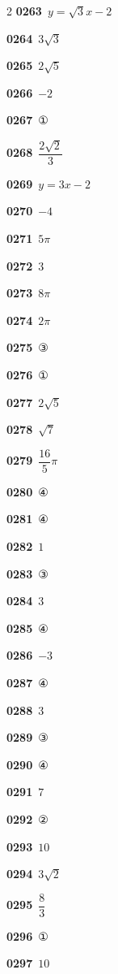 \documentclass[10pt,a4paper]{article}
\begin{document}
\begin{multicols}{2}
\noindent\textbf{0263}\ $y=\sqrt{3}x-2$\par
\noindent\textbf{0264}\ $3\sqrt{3}$\par
\noindent\textbf{0265}\ $2\sqrt{5}$\par
\noindent\textbf{0266}\ $-2$\par
\noindent\textbf{0267}\ ①\par
\noindent\textbf{0268}\ $\dfrac{2\sqrt{2}}{3}$\par
\noindent\textbf{0269}\ $y=3x-2$\par
\noindent\textbf{0270}\ $-4$\par
\noindent\textbf{0271}\ $5\pi$\par
\noindent\textbf{0272}\ $3$\par
\noindent\textbf{0273}\ $8\pi$\par
\noindent\textbf{0274}\ $2\pi$\par
\noindent\textbf{0275}\ ③\par
\noindent\textbf{0276}\ ①\par
\noindent\textbf{0277}\ $2\sqrt{5}$\par
\noindent\textbf{0278}\ $\sqrt{7}$\par
\noindent\textbf{0279}\ $\dfrac{16}{5}\pi$\par
\noindent\textbf{0280}\ ④\par
\noindent\textbf{0281}\ ④\par
\noindent\textbf{0282}\ $1$\par
\noindent\textbf{0283}\ ③\par
\noindent\textbf{0284}\ $3$\par
\noindent\textbf{0285}\ ④\par
\noindent\textbf{0286}\ $-3$\par
\noindent\textbf{0287}\ ④\par
\noindent\textbf{0288}\ $3$\par
\noindent\textbf{0289}\ ③\par
\noindent\textbf{0290}\ ④\par
\noindent\textbf{0291}\ $7$\par
\noindent\textbf{0292}\ ②\par
\noindent\textbf{0293}\ $10$\par
\noindent\textbf{0294}\ $3\sqrt{2}$\par
\noindent\textbf{0295}\ $\dfrac{8}{3}$\par
\noindent\textbf{0296}\ ①\par
\noindent\textbf{0297}\ $10$\par

\end{multicols}
\end{document}
